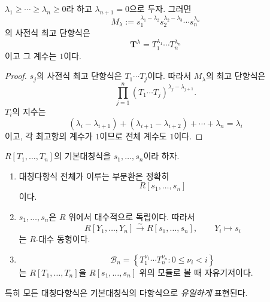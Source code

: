 \begin{lemma}
\label{lem:symmetric-leading-monomial}
$\lambda_1\ge\cdots\ge\lambda_n\ge0$라 하고 $\lambda_{n+1}=0$으로 두자. 그러면
\[
  M_\lambda
  :=s_1^{\lambda_1-\lambda_2}
    s_2^{\lambda_2-\lambda_3}\cdots
    s_n^{\lambda_n}
\]
의 사전식 최고 단항식은
\[
  \mathbf T^\lambda
  =T_1^{\lambda_1}\cdots T_n^{\lambda_n}
\]
이고 그 계수는 $1$이다.
\end{lemma}

\begin{proof}
$s_j$의 사전식 최고 단항식은 $T_1\cdots T_j$이다. 따라서 $M_\lambda$의 최고 단항식은
\[
  \prod_{j=1}^n
  (T_1\cdots T_j)^{\lambda_j-\lambda_{j+1}}.
\]
$T_i$의 지수는
\[
  (\lambda_i-\lambda_{i+1})+
  (\lambda_{i+1}-\lambda_{i+2})+\cdots+\lambda_n
  =\lambda_i
\]
이고, 각 최고항의 계수가 $1$이므로 전체 계수도 $1$이다.
\end{proof}

\begin{theorem}
\label{thm:fundamental-symmetric-polynomials}
$R[T_1,\dots,T_n]$의 기본대칭식을 $s_1,\dots,s_n$이라 하자.
\begin{enumerate}[label=(\roman*)]
  \item 대칭다항식 전체가 이루는 부분환은 정확히
  \[
    R[s_1,\dots,s_n]
  \]
  이다.
  \item $s_1,\dots,s_n$은 $R$ 위에서 대수적으로 독립이다. 따라서
  \[
    R[Y_1,\dots,Y_n]
    \xrightarrow{\sim}
    R[s_1,\dots,s_n],
    \qquad
    Y_i\longmapsto s_i
  \]
  는 $R$-대수 동형이다.
  \item
  \[
    \mathcal B_n=
    \left\{
    T_1^{\nu_1}\cdots T_n^{\nu_n}:
    0\le\nu_i<i
    \right\}
  \]
  는 $R[T_1,\dots,T_n]$을 $R[s_1,\dots,s_n]$ 위의 모듈로 볼 때 자유기저이다.
\end{enumerate}
특히 모든 대칭다항식은 기본대칭식의 다항식으로 \emph{유일하게} 표현된다.
\end{theorem}

